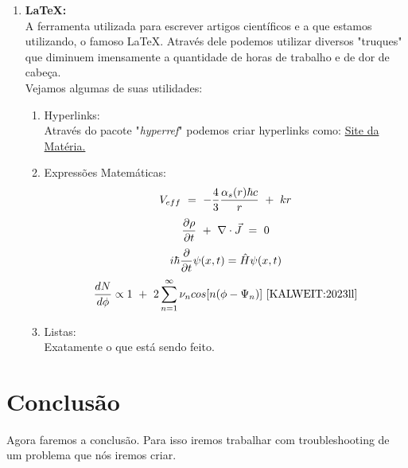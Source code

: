 \documentclass[12pt]{article}
\begin{document}
\begin{enumerate}[label=\bf{\Roman*}.]
        \item \textbf{LaTeX:} \\
        A ferramenta utilizada para escrever artigos científicos e a que estamos utilizando, o famoso \LaTeX. Através dele podemos utilizar diversos "truques" que diminuem imensamente a quantidade de horas de trabalho e de dor de cabeça. \\
        Vejamos algumas de suas utilidades:
        \begin{enumerate}[label=\roman*.]
            \item Hyperlinks: \\
            Através do pacote "\textit{hyperref}" podemos criar hyperlinks como: \href{https://github.com/dune-mdias/F056/tree/main}{Site da Matéria.}
            \item Expressões Matemáticas: \\
            \begin{equation}
            V_{eff} \ = \ -\frac{4}{3}\frac{\alpha_{s}(r)\hbar c}{r} \ + \ kr \\
            \end{equation}
            \begin{equation}
            \frac{\partial\rho}{\partial t} \ + \ \nabla \cdot \vec{J} \ =  \ 0 \\
            \end{equation}
            \begin{equation}
            i\hbar \frac{\partial}{\partial t} \psi(x,t) = \hat{H} \psi(x,t) \\
            \end{equation} 
            \begin{equation}
            \frac{dN}{d\phi} \propto 1 \ + \ 2\sum_{n=1}^{\infty}\nu_ncos[n(\phi-\Psi_n)] \
            \cite{KALWEIT:2023ll}
            \end{equation}
            \item Listas: \\
            Exatamente o que está sendo feito.
        \end{enumerate}
    \end{enumerate}

\section{Conclusão}
Agora faremos a conclusão. Para isso iremos trabalhar com troubleshooting de um problema que nós iremos criar.



\end{document}
